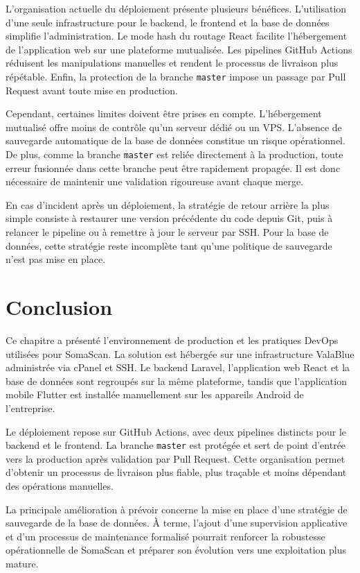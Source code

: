 L'organisation actuelle du déploiement présente plusieurs bénéfices. L'utilisation d'une seule infrastructure pour le backend, le frontend et la base de données simplifie l'administration. Le mode hash du routage React facilite l'hébergement de l'application web sur une plateforme mutualisée. Les pipelines GitHub Actions réduisent les manipulations manuelles et rendent le processus de livraison plus répétable. Enfin, la protection de la branche \texttt{master} impose un passage par Pull Request avant toute mise en production.

Cependant, certaines limites doivent être prises en compte. L'hébergement mutualisé offre moins de contrôle qu'un serveur dédié ou un VPS. L'absence de sauvegarde automatique de la base de données constitue un risque opérationnel. De plus, comme la branche \texttt{master} est reliée directement à la production, toute erreur fusionnée dans cette branche peut être rapidement propagée. Il est donc nécessaire de maintenir une validation rigoureuse avant chaque merge.

En cas d'incident après un déploiement, la stratégie de retour arrière la plus simple consiste à restaurer une version précédente du code depuis Git, puis à relancer le pipeline ou à remettre à jour le serveur par SSH. Pour la base de données, cette stratégie reste incomplète tant qu'une politique de sauvegarde n'est pas mise en place.

\section{Conclusion}

Ce chapitre a présenté l'environnement de production et les pratiques DevOps utilisées pour SomaScan. La solution est hébergée sur une infrastructure ValaBlue administrée via cPanel et SSH. Le backend Laravel, l'application web React et la base de données sont regroupés sur la même plateforme, tandis que l'application mobile Flutter est installée manuellement sur les appareils Android de l'entreprise.

Le déploiement repose sur GitHub Actions, avec deux pipelines distincts pour le backend et le frontend. La branche \texttt{master} est protégée et sert de point d'entrée vers la production après validation par Pull Request. Cette organisation permet d'obtenir un processus de livraison plus fiable, plus traçable et moins dépendant des opérations manuelles.

La principale amélioration à prévoir concerne la mise en place d'une stratégie de sauvegarde de la base de données. À terme, l'ajout d'une supervision applicative et d'un processus de maintenance formalisé pourrait renforcer la robustesse opérationnelle de SomaScan et préparer son évolution vers une exploitation plus mature.
